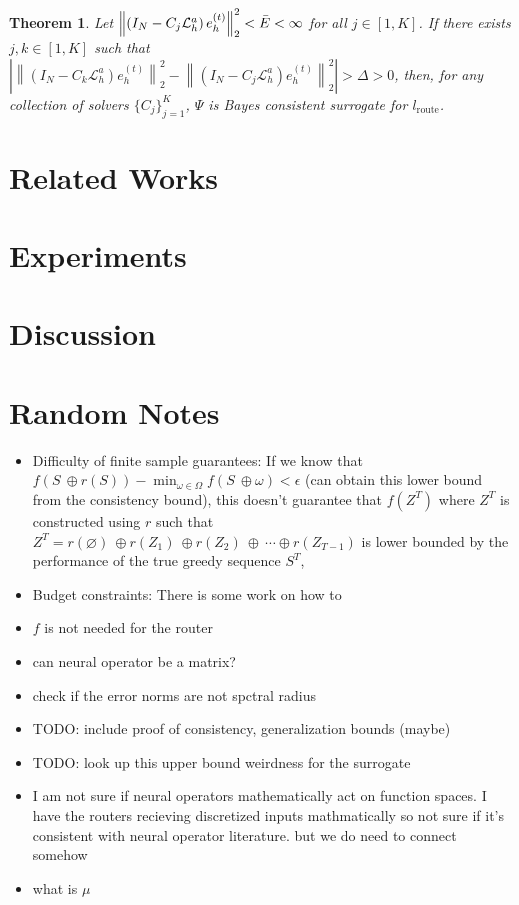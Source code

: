 \documentclass{article} %
\newtheorem{theorem}{Theorem}[section]
\begin{document}
\begin{theorem} \label{th:consistency}
    Let $\left\|\left( I_N - C_{j} \mathcal{L}_{h}^a\right)e^{(t)}_h\right\|^2_2 < \Bar{E} < \infty$  for all $j \in [1, K]$. If there exists $j, k \in [1, K]$ such that $\left|\left\|\left( I_N - C_{k} \mathcal{L}_{h}^a\right)e^{(t)}_h\right\|^2_2 - \left\|\left( I_N - C_{j} \mathcal{L}_{h}^a\right)e^{(t)}_h\right\|^2_2\right| > \Delta > 0$, then, for any collection of solvers $\{C_j\}_{j= 1}^K$, $\Psi$ is Bayes consistent surrogate for $l_{\text{route}}$.
\end{theorem}


\section{Related Works}


\section{Experiments}

\section{Discussion}


\section{Random Notes}

\begin{itemize}
    \item Difficulty of finite sample guarantees: If we know that $f(S \ \oplus r(S)) - \min_{\omega \in \Omega} f(S \ \oplus \omega) < \epsilon$ (can obtain this lower bound from the consistency bound), this doesn't guarantee that $f(Z^T)$ where $Z^T$ is constructed using $r$ such that $Z^T = r(\varnothing) \ \oplus r(Z_1) \ \oplus r(Z_2) \ \oplus \ \cdots \oplus r(Z_{T - 1})$ is lower bounded by the performance of the true greedy sequence $S^T$,
    \item Budget constraints: There is some work on how to 
    \item $f$ is not needed for the router
    \item can neural operator be a matrix?
    \item check if the error norms are not spctral radius
    \item TODO: include proof of consistency, generalization bounds (maybe)
    \item TODO: look up this upper bound weirdness for the surrogate
    \item {} I am not sure if neural operators mathematically act on function spaces. I have the routers recieving discretized inputs mathmatically so not sure if it's consistent with neural operator literature. but we do need to connect  somehow
    \item what is $\mu$
\end{itemize}
\end{document}
